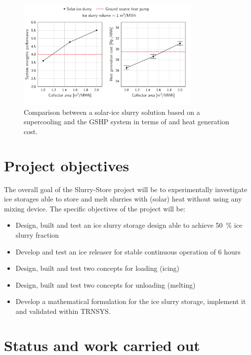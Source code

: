 \documentclass[english]{SFOEYearlyReportEnglish_2018}
\begin{document}
\begin{figure}[!htbp]
    \centering
    \includegraphics[trim={0 0 0 0},clip,width=0.8\textwidth]{figures/cost-Slurry-direct-large-errorBar.pdf}
    \caption{Comparison between a solar-ice slurry solution based on a supercooling and the GSHP system in terms of \si{\spf} and heat generation cost.}
   \label{fig:solar-ice}
\end{figure}


\section{Project objectives}

The overall goal of the Slurry-Store project will be to experimentally investigate ice storages able to store and melt slurries with (solar) heat without using any mixing device.
The specific objectives of the project will be:
\begin{itemize}
    \item Design, built and test an ice slurry storage design able to achieve 50~\% ice slurry fraction
    \item Develop and test an ice releaser for stable continuous operation of 6 hours
    \item Design, built and test two concepts for loading (icing)
    \item Design, built and test two concepts for unloading (melting)
    \item Develop a mathematical formulation for the ice slurry storage, implement it and validated within TRNSYS.
\end{itemize}

\section{Status and work carried out}
\end{document}
